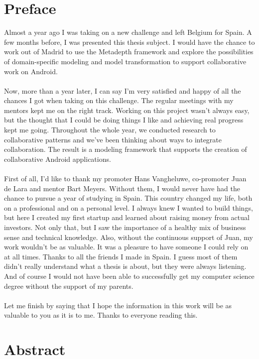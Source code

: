 \chapter*{Preface}

Almost a year ago I was taking on a new challenge and left Belgium for Spain. A few months before, I was presented this thesis subject. I would have the chance to work out of Madrid to use the Metadepth framework and explore the possibilities of domain-specific modeling and model transformation to support collaborative work on Android. \\ \\
Now, more than a year later, I can say I'm very satisfied and happy of all the chances I got when taking on this challenge. The regular meetings with my mentors kept me on the right track. Working on this project wasn't always easy, but the thought that I could be doing things I like and achieving real progress kept me going. Throughout the whole year, we conducted research to collaborative patterns and we've been thinking about ways to integrate collaboration. The result is a modeling framework that supports the creation of collaborative Android applications.   \\ \\
First of all, I'd like to thank my promoter Hans Vangheluwe, co-promoter Juan de Lara and mentor Bart Meyers. Without them, I would never have had the chance to pursue a year of studying in Spain. This country changed my life, both on a professional and on a personal level. I always knew I wanted to build things, but here I created my first startup and learned about raising money from actual investors. Not only that, but I saw the importance of a healthy mix of business sense and technical knowledge. Also, without the continuous support of Juan, my work wouldn't be as valuable. It was a pleasure to have someone I could rely on at all times. Thanks to all the friends I made in Spain. I guess most of them didn't really understand what a thesis is about, but they were always listening. And of course I would not have been able to successfully get my computer science degree without the support of my parents. \\ \\ 
Let me finish by saying that I hope the information in this work will be as valuable to you as it is to me. Thanks to everyone reading this.

\chapter*{Abstract}

